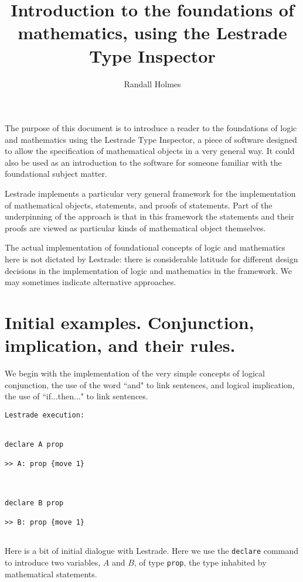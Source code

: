 \documentclass[12pt]{article}
\title{Introduction to the foundations of mathematics, using the Lestrade Type Inspector}
\author{Randall Holmes}
\begin{document}
\maketitle

\tableofcontents

\newpage

The purpose of this document is to introduce a reader to the foundations of logic and mathematics using the Lestrade Type Inspector, a piece of software designed to allow the specification of mathematical objects in a very general way.  It could also be used as an introduction to the software for someone familiar with the foundational subject matter.

Lestrade implements a particular very general framework for the implementation of mathematical objects, statements, and proofs of statements.  Part of the underpinning of the approach is that in this framework the statements and their proofs are viewed as  particular kinds of mathematical object themselves.

The actual implementation of foundational concepts of logic and mathematics here is not dictated by Lestrade:  there is considerable latitude for different design decisions in the implementation of logic and mathematics in the framework.  We may sometimes indicate alternative approaches.

\section{Initial examples.  Conjunction, implication, and their rules.}

We begin with the implementation of the very simple concepts of logical conjunction, the use of the word ``and" to link sentences, and logical implication, the use of ``if$\ldots$then$\ldots$" to link sentences.

\begin{verbatim}Lestrade execution:


declare A prop

>> A: prop {move 1}



declare B prop

>> B: prop {move 1}


\end{verbatim}

Here is a bit of initial dialogue with Lestrade.  Here we use the {\tt declare} command to introduce two variables, $A$ and $B$, of type {\tt prop},
the type inhabited by mathematical statements.
\end{document}
